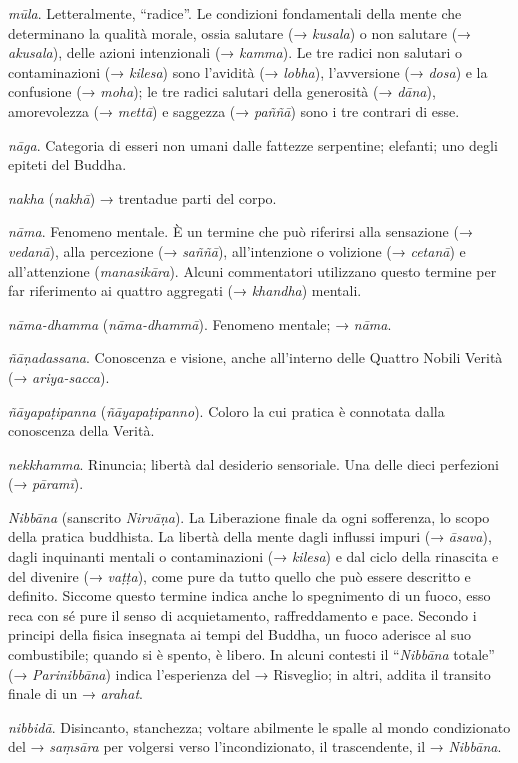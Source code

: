 \emph{mūla}. Letteralmente, ``radice''. Le condizioni fondamentali della
mente che determinano la qualità morale, ossia salutare (→
\emph{kusala}) o non salutare (→ \emph{akusala}), delle azioni
intenzionali (→ \emph{kamma}). Le tre radici non salutari o
contaminazioni (→ \emph{kilesa}) sono l'avidità (→ \emph{lobha}),
l'avversione (→ \emph{dosa}) e la confusione (→ \emph{moha}); le tre
radici salutari della generosità (→ \emph{dāna}), amorevolezza (→
\emph{mettā}) e saggezza (→ \emph{paññā}) sono i tre contrari di esse.

\emph{nāga}. Categoria di esseri non umani dalle fattezze serpentine;
elefanti; uno degli epiteti del Buddha.

\emph{nakha} (\emph{nakhā}) → trentadue parti del corpo.

\emph{nāma}. Fenomeno mentale. È un termine che può riferirsi alla
sensazione (→ \emph{vedanā}), alla percezione (→ \emph{saññā}),
all'intenzione o volizione (→ \emph{cetanā}) e all'attenzione
(\emph{manasikāra}). Alcuni commentatori utilizzano questo termine per
far riferimento ai quattro aggregati (→ \emph{khandha}) mentali.

\emph{nāma-dhamma} (\emph{nāma-dhammā}). Fenomeno mentale; →
\emph{nāma}.

\emph{ñāṇadassana}. Conoscenza e visione, anche all'interno delle
Quattro Nobili Verità (→ \emph{ariya-sacca}).

\emph{ñāyapaṭipanna} (\emph{ñāyapaṭipanno}). Coloro la cui pratica è
connotata dalla conoscenza della Verità.

\emph{nekkhamma}. Rinuncia; libertà dal desiderio sensoriale. Una delle
dieci perfezioni (→ \emph{pāramī}).

\emph{Nibbāna} (sanscrito \emph{Nirvāṇa}). La Liberazione finale da ogni
sofferenza, lo scopo della pratica buddhista. La libertà della mente
dagli influssi impuri (→ \emph{āsava}), dagli inquinanti mentali o
contaminazioni (→ \emph{kilesa}) e dal ciclo della rinascita e del
divenire (→ \emph{vaṭṭa}), come pure da tutto quello che può essere
descritto e definito. Siccome questo termine indica anche lo spegnimento
di un fuoco, esso reca con sé pure il senso di acquietamento,
raffreddamento e pace. Secondo i principi della fisica insegnata ai
tempi del Buddha, un fuoco aderisce al suo combustibile; quando si è
spento, è libero. In alcuni contesti il ``\emph{Nibbāna} totale'' (→
\emph{Parinibbāna}) indica l'esperienza del → Risveglio; in altri,
addita il transito finale di un → \emph{arahat}.

\emph{nibbidā}. Disincanto, stanchezza; voltare abilmente le spalle al
mondo condizionato del → \emph{saṃsāra} per volgersi verso
l'incondizionato, il trascendente, il → \emph{Nibbāna}.

